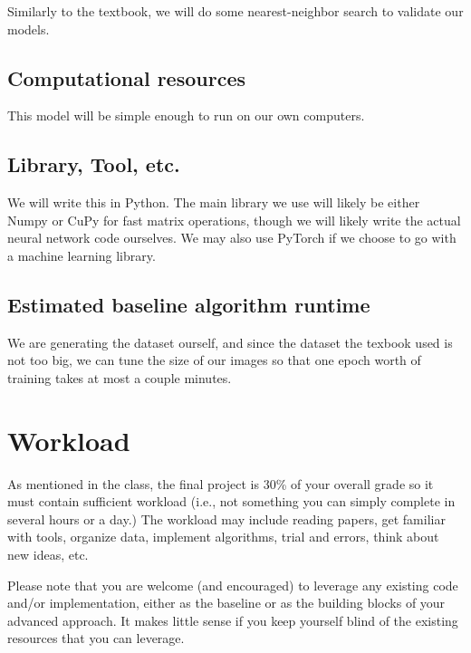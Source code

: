 \documentclass{article}
\begin{document}
Similarly to the textbook, we will do some nearest-neighbor search to validate our models.

\subsection{Computational resources}

This model will be simple enough to run on our own computers.

\subsection{Library, Tool, etc.}
We will write this in Python.  The main library we use will likely be either Numpy or CuPy for fast matrix operations, though we will likely write the actual neural network code ourselves.  We may also use PyTorch if we choose to go with a machine learning library.

\subsection{Estimated baseline algorithm runtime}

We are generating the dataset ourself, and since the dataset the texbook used is not too big, we can tune the size of our images so that one epoch worth of training takes at most a couple minutes.

\section{Workload}
{\color{red}
As mentioned in the class, the final project is 30\% of your overall grade so it must contain sufficient workload (i.e., not something you can simply complete in several hours or a day.) The workload may include reading papers, get familiar with tools, organize data, implement algorithms, trial and errors, think about new ideas, etc.

Please note that you are welcome (and encouraged) to leverage any existing code and/or implementation, either as the baseline or as the building blocks of your advanced approach. It makes little sense if you keep yourself blind of the existing resources that you can leverage. 
}
\end{document}
